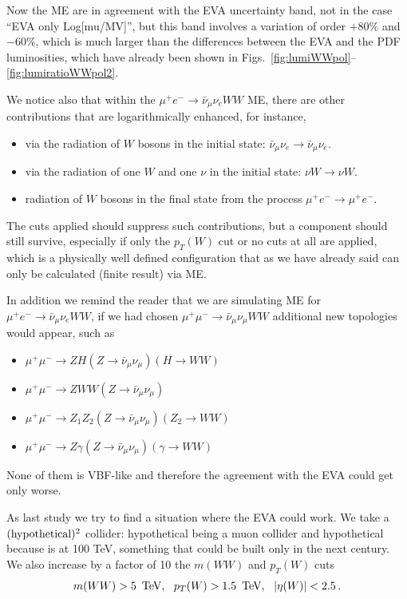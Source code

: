 \documentclass[a4paper,11pt]{article}
\begin{document}
Now the ME are in agreement with the EVA uncertainty band, not in the case ``EVA only Log[mu/MV]'', but this band involves a variation of order $+80\%$ and $-60\%$, which is much larger than the differences between the EVA and the PDF luminosities, which have already been shown in Figs.~\ref{fig:lumiWWpol}--\ref{fig:lumiratioWWpol2}.

We notice also that within the $\mu^+e^-\to\bar \nu_\mu \nu_e WW$ ME, there are other contributions that are logarithmically enhanced, for instance,
\begin{itemize}
\item via the radiation of $W$ bosons in the initial state: $\bar \nu_\mu \nu_e \to \bar \nu_\mu \nu_e $.
\item via the radiation of one $W$  and one $\nu$ in the initial state: $\nu W \to \nu W  $.
\item radiation of $W$ bosons in the final state from the process $\mu^+e^-\to \mu^+e^-$.
\end{itemize}

The cuts applied should suppress such contributions, but a component should still survive, especially if only the $p_T(W)$ cut or no cuts at all are applied, which is a physically well defined configuration that as we have already said can only be calculated (finite result) via ME.

In addition we remind the reader that we are simulating ME for  $\mu^+e^-\to\bar \nu_\mu \nu_e WW$, if we had chosen $\mu^+\mu^-\to\bar \nu_\mu \nu_\mu WW$ additional new topologies would appear, such as

\begin{itemize}
\item $\mu^+\mu^-\to ZH (Z\to \bar \nu_\mu \nu_\mu ) (H \to WW )$
\item $\mu^+\mu^-\to ZWW (Z\to \bar \nu_\mu \nu_\mu ) $
\item $\mu^+\mu^-\to Z_1Z_2 (Z\to \bar \nu_\mu \nu_\mu ) (Z_2 \to WW) $
\item $\mu^+\mu^-\to Z \gamma (Z\to \bar \nu_\mu \nu_\mu ) (\gamma \to WW) $
\end{itemize}

None of them is VBF-like and therefore the agreement with the EVA could get only worse.

As last study we try to find a situation where the EVA could work. We take a $(\rm hypothetical)^2$ collider: hypothetical being a muon collider and hypothetical because is at 100 TeV, something that could be built only in the next century. We also increase by a factor of 10 the $m(WW)$ and $p_T(W)$ cuts 
\begin{equation}
m(WW) > 5~\,\textrm{TeV}, ~~p_T(W) > 1.5~\,\textrm{TeV},~~ |\eta(W)|<2.5 \,.
\end{equation}
\end{document}
